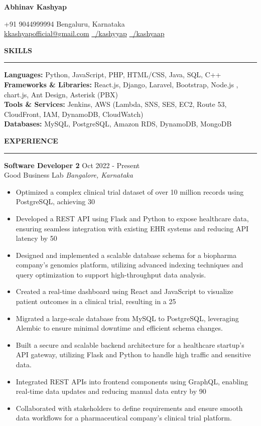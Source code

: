 \documentclass[10pt]{article}
\newcommand{\name}[1]{
    \begin{center}
        {\LARGE \bfseries #1}
    \end{center}
}
\newcommand{\contact}[1]{
    \begin{center}
        {\small #1}
    \end{center}
}
\newcommand{\rSection}[1]{
    \vspace{1em}
    {\large \bfseries \MakeUppercase{#1}}
    \vspace{0.5em}
    \hrule
}
\begin{document}
\name{Abhinav Kashyap}
\vspace{-3pt}
\contact{+91 9044999994  Bengaluru, Karnataka \\
\vspace{2pt}
\href{mailto:kkashyapofficial@gmail.com}{kkashyapofficial@gmail.com} \hspace{1em}
\href{https://www.linkedin.com/in/kashyyap/}{\faLinkedin\ /kashyyap} \hspace{1em}
\href{https://github.com/kashyaap}{\faGithub\ /kashyaap}}

\vspace{-12pt}
\rSection{Skills}
\textbf{Languages:} Python, JavaScript, PHP, HTML/CSS, Java, SQL, C++ \\[3pt]
\textbf{Frameworks \& Libraries:} React.js, Django, Laravel, Bootstrap, Node.js , chart.js, Ant Design, Asterisk (PBX) \\[3pt]
\textbf{Tools \& Services:} Jenkins, AWS (Lambda, SNS, SES, EC2, Route 53, CloudFront, IAM, DynamoDB, CloudWatch) \\[3pt]
\textbf{Databases:} MySQL, PostgreSQL, Amazon RDS, DynamoDB, MongoDB \\

\vspace{-17pt}
\rSection{Experience}

\textbf{Software Developer 2} \hfill Oct 2022 - Present\\
Good Business Lab \hfill \textit{Bangalore, Karnataka}
\begin{itemize}
    \item Optimized a complex clinical trial dataset of over 10 million records using PostgreSQL, achieving 30%
    \item Developed a REST API using Flask and Python to expose healthcare data, ensuring seamless integration with existing EHR systems and reducing API latency by 50%
    \item Designed and implemented a scalable database schema for a biopharma company's genomics platform, utilizing advanced indexing techniques and query optimization to support high-throughput data analysis.
    \item Created a real-time dashboard using React and JavaScript to visualize patient outcomes in a clinical trial, resulting in a 25%
    \item Migrated a large-scale database from MySQL to PostgreSQL, leveraging Alembic to ensure minimal downtime and efficient schema changes.
    \item Built a secure and scalable backend architecture for a healthcare startup's API gateway, utilizing Flask and Python to handle high traffic and sensitive data.
    \item Integrated REST APIs into frontend components using GraphQL, enabling real-time data updates and reducing manual data entry by 90%
    \item Collaborated with stakeholders to define requirements and ensure smooth data workflows for a pharmaceutical company's clinical trial platform.
\end{itemize}
\end{document}
